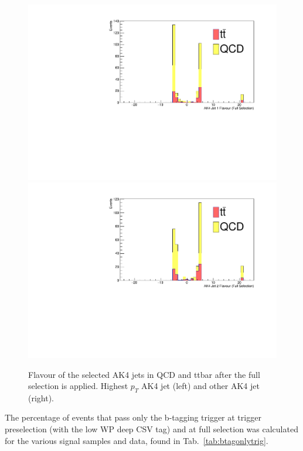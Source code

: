 \begin{figure}[thb!]
\begin{center}
\includegraphics[scale=0.35]{Figures/checkpreflavAK1FS.pdf}
\includegraphics[scale=0.35]{Figures/checkpreflavAK2FS.pdf}
\end{center}
\caption{Flavour of the selected AK4 jets in QCD and ttbar after the full selection is applied. Highest $p_{T}$ AK4 jet (left) and other AK4 jet (right).}
\label{fig:flav4}
\end{figure}

The percentage of events that pass only the b-tagging trigger at trigger preselection (with the low WP deep CSV tag) and at full selection was calculated for the various signal samples and data, found in Tab.~\ref{tab:btagonlytrig}.

